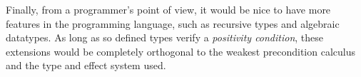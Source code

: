 \documentclass[a4paper]{llncs}
\begin{document}
Finally, from a programmer's point of view, it would be nice to have more
features in the programming language, such as recursive types and algebraic
datatypes. As long as so defined types verify a {\em positivity condition},
these extensions would be completely orthogonal to the weakest precondition
calculus and the type and effect system used.


{}
\end{document}
